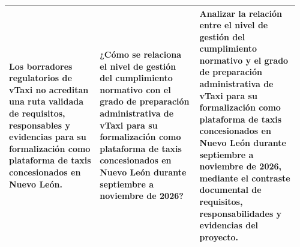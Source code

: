 {\begin{landscape}
\begin{longtable}{@{}p{0.30\linewidth}p{0.33\linewidth}p{0.33\linewidth}@{}}
Los borradores regulatorios de vTaxi no acreditan una ruta validada de requisitos, responsables y evidencias para su formalización como plataforma de taxis concesionados en Nuevo León. & ¿Cómo se relaciona el nivel de gestión del cumplimiento normativo con el grado de preparación administrativa de vTaxi para su formalización como plataforma de taxis concesionados en Nuevo León durante septiembre a noviembre de 2026? & Analizar la relación entre el nivel de gestión del cumplimiento normativo y el grado de preparación administrativa de vTaxi para su formalización como plataforma de taxis concesionados en Nuevo León durante septiembre a noviembre de 2026, mediante el contraste documental de requisitos, responsabilidades y evidencias del proyecto.\\
\bottomrule\end{longtable}
\endgroup


\end{landscape}}
